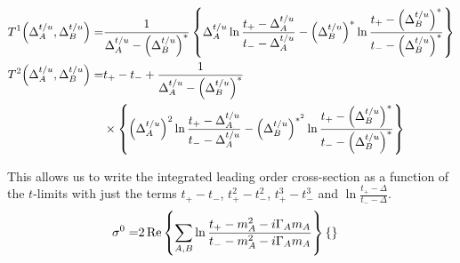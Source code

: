\documentclass[../main.tex]{subfiles}
\begin{document}
\begin{subequations}
\begin{align}
                    T^1\!\left(\Delta_A^{t/u}, \Delta_B^{t/u}\right) = & \frac{1}{\Delta_A^{t/u} - \left(\Delta_B^{t/u}\right)^\ast} \left\{\Delta_A^{t/u} \ln\frac{t_+ - \Delta_A^{t/u}}{t_- - \Delta_A^{t/u}} - \left(\Delta_B^{t/u}\right)^\ast \ln\frac{t_+ - \left(\Delta_B^{t/u}\right)^\ast}{t_- - \left(\Delta_B^{t/u}\right)^\ast}\right\} \\
                    \nonumber
                    T^2\!\left(\Delta_A^{t/u}, \Delta_B^{t/u}\right) = & t_+ - t_- + \frac{1}{\Delta_A^{t/u} - \left(\Delta_B^{t/u}\right)^\ast}                                                                                                                                                                                      \\
                                                                    & \times \left\{\left(\Delta_A^{t/u}\right)^2 \ln\frac{t_+ - \Delta_A^{t/u}}{t_- - \Delta_A^{t/u}} - \left(\Delta_B^{t/u}\right)^{\ast^2} \ln\frac{t_+ - \left(\Delta_B^{t/u}\right)^\ast}{t_- - \left(\Delta_B^{t/u}\right)^\ast}\right\}
                \end{align}
            \end{subequations}

            This allows us to write the integrated leading order cross-section as a function of the \(t\)-limits with just the terms \(t_+-t_-\), \(t_+^2-t_-^2\), \(t_+^3-t_-^3\) and \(\ln\frac{t_+-\Delta}{t_--\Delta}\).
            \begin{align}
                \sigma^0 = & 2\operatorname{Re}\left\{\sum_{A,B} \ln\frac{t_+ - m_A^2 - i\Gamma_A m_A}{t_- - m_A^2 - i\Gamma_A m_A}\right\} \left\{\right\}
            \end{align}
\end{document}
